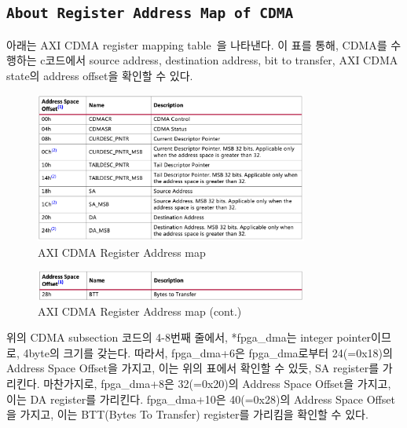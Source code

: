 \documentclass{article}
\begin{document}
\subsection*{\texttt{About Register Address Map of CDMA}}
아래는 AXI CDMA register mapping table~\cite{CDMA}을 나타낸다. 이 표를 통해, CDMA를 수행하는 c코드에서 source address, destination address, bit to transfer, AXI CDMA state의 address offset을 확인할 수 있다.
\begin{figure}[htb!]
	\centering
	\includegraphics[width=0.8\textwidth]{fig/cmda_addrmap_1.png}
\caption{AXI CDMA Register Address map}
\label{fig4}
\end{figure}
\begin{figure}[htb!]
	\centering
	\includegraphics[width=0.8\textwidth]{fig/cdma_addrmap_2.png}
\caption{AXI CDMA Register Address map (cont.)}
\label{fig5}
\end{figure}
\newpage
위의 CDMA subsection 코드의 4-8번째 줄에서, *fpga\_dma는 integer pointer이므로, 4byte의 크기를 갖는다. 따라서, fpga\_dma+6은 fpga\_dma로부터 24(=0x18)의 Address Space Offset을 가지고, 이는 위의 표에서 확인할 수 있듯, SA register를 가리킨다. 마찬가지로, fpga\_dma+8은 32(=0x20)의 Address Space Offset을 가지고, 이는 DA register를 가리킨다. fpga\_dma+10은 40(=0x28)의 Address Space Offset을 가지고, 이는 BTT(Bytes To Transfer) register를 가리킴을 확인할 수 있다.
\end{document}
